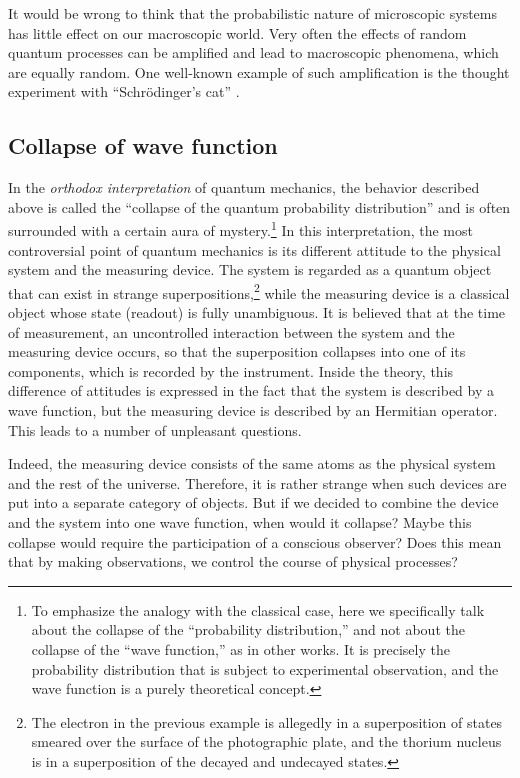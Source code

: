 \documentclass[nochecklpage]{stefan1}
\theoremstyle{definition}
\begin{document}
It would be wrong to think that the probabilistic nature of microscopic
systems has little effect on our macroscopic world. Very often the
effects of random quantum processes can be amplified and lead to
macroscopic phenomena, which are equally random. One well-known example
of such amplification is the thought experiment with ``Schr\"{o}dinger's
cat'' \cite{cat}.\vfill

\subsection{Collapse of wave function}\label{ss:unpredictability2}
In the \emph{orthodox interpretation} of
quantum mechanics, the behavior described above is called the ``collapse
of the quantum probability distribution''  and is often surrounded with
a certain aura of mystery.\footnote{To emphasize the analogy with the
classical case, here we specifically talk about the collapse of the
``probability distribution,'' and not about the collapse of the ``wave
function,'' as in other works. It is precisely the probability
distribution that is subject to experimental observation, and the wave
function is a purely theoretical concept.} In this interpretation, the
most controversial point of quantum mechanics is its different attitude
to the physical system and the measuring device. The system is regarded
as a quantum object that can exist in strange
superpositions,\footnote{The electron in the previous example is
allegedly in a superposition of states smeared over the surface of the
photographic plate, and the thorium nucleus is in a superposition of the
decayed and undecayed states.} while the measuring device is a classical
object whose state (readout) is fully unambiguous. It is believed that
at the time of measurement, an uncontrolled interaction between the
system and the measuring device occurs, so that the superposition
collapses into one of its components, which is recorded by the
instrument. Inside the theory, this difference of attitudes is expressed
in the fact that the system is described by a wave function, but the
measuring device is described by an Hermitian operator. This leads to a number of
unpleasant questions.

Indeed, the measuring device consists of the same atoms as the physical
system and the rest of the universe. Therefore, it is rather strange
when such devices are put into a separate category of objects. But if
we decided to combine the device and the system into one wave function,
when would it collapse? Maybe this collapse would require the
participation of a conscious observer? Does this mean that by making
observations, we control the course of physical processes?
\end{document}
